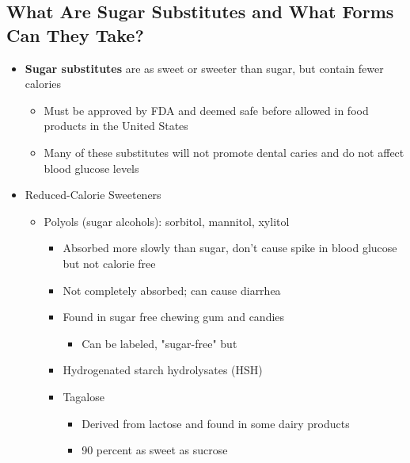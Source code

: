 \documentclass[12pt]{article}
\begin{document}
        \subsection{What Are Sugar Substitutes and What Forms Can They Take?}
            \begin{itemize}
                \item \textbf{Sugar substitutes} are as sweet or sweeter than sugar, but contain fewer calories
                    \begin{itemize}
                        \item Must be approved by FDA and deemed safe before allowed in food products in the United States
                        \item Many of these substitutes will not promote dental caries and do not affect blood glucose levels
                    \end{itemize}
                \item Reduced-Calorie Sweeteners
                    \begin{itemize}
                        \item Polyols (sugar alcohols): sorbitol, mannitol, xylitol
                            \begin{itemize}
                                \item Absorbed more slowly than sugar, don't cause spike in blood glucose but not calorie free
                                \item Not completely absorbed; can cause diarrhea
                                \item Found in sugar free chewing gum and candies
                                    \begin{itemize}
                                        \item Can be labeled, "sugar-free" but
                                    \end{itemize}
                                \item Hydrogenated starch hydrolysates (HSH)
                                \item Tagalose
                                    \begin{itemize}
                                        \item Derived from lactose and found in some dairy products
                                        \item 90 percent as sweet as sucrose
                                    \end{itemize}

\end{itemize}
\end{itemize}
\end{itemize}
\end{document}
